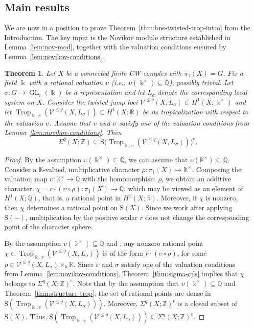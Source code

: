 \documentclass[11pt]{amsart}
\newtheorem{theorem}{Theorem}[section]
\theoremstyle{definition}
\newcommand{\Z}{\mathbb{Z}}
\newcommand{\Q}{\mathbb{Q}}
\newcommand{\R}{\mathbb{R}}
\newcommand{\K}{\mathbb{K}}
\renewcommand{\k}{\Bbbk}
\newcommand{\VV}{\mathcal{V}}
\newcommand{\rS}{\mathrm{S}}
\DeclareMathOperator{\GL}{GL}
\DeclareMathOperator{\Trop}{Trop}
\newcommand{\compl}{\mathrm{c}}
\begin{document}
\subsection{Main results}
\label{subsec:main}

We are now in a position to prove Theorem~\ref{thm:bns-twisted-trop-intro}
from the Introduction. The key input is the Novikov module structure
established in Lemma~\ref{lem:nov-mod}, together with the valuation
conditions ensured by Lemma~\ref{lem:novikov-conditions}.

\begin{theorem}
\label{thm:bns-twisted-trop}
Let $X$ be a connected finite CW-complex with $\pi_1(X)=G$. 
Fix a field $\k$ with a rational valuation
$\upsilon$ (i.e., $\upsilon(\k^{\times})\subseteq \Q$), possibly trivial. 
Let $\sigma\colon G\to \GL_r(\k)$ be a representation 
and let $L_\sigma$ denote the corresponding local system on $X$. 
Consider the twisted jump loci 
$\VV^{\le q}(X,L_\sigma)\subset H^1(X;\k^{\times})$ 
and let $\Trop_{\k,\upsilon}( \VV^{\le q}(X,L_\sigma))
\subset H^1(X;\R)$ be its tropicalization with respect 
to the valuation $\upsilon$. Assume that $\upsilon$ and $\sigma$ satisfy one of the 
valuation conditions from 
Lemma~\ref{lem:novikov-conditions}.  Then 
\[
\Sigma^q(X;\Z) \subseteq 
\rS\big(\!\Trop_{\k,\upsilon}(\VV^{\le q}(X,L_{\sigma}))\big)^{\compl}.
\]
\end{theorem}

\begin{proof}
By the assumption $\upsilon(\k^\times)\subseteq \Q$, we can assume that 
$\upsilon(\K^\times)\subseteq \Q$. Consider a $\K$-valued, multiplicative 
character $\rho\colon \pi_1(X)\to \K^{\times}$. Composing the valuation map 
$\upsilon\colon \K^{\times}\to \Q$ with the homomorphism 
$\rho$, we obtain an additive character, 
$\chi= r\cdot(\upsilon\circ \rho)\colon \pi_1(X) \to \Q$, 
which may be viewed as an element of $H^1(X;\Q)$, that is, 
a rational point in $H^1(X;\R)$. 
Moreover, if $\chi$ is nonzero, then $\chi$ 
determines a rational point on $\rS(X)$. 
Since we work after applying $\rS(-)$, multiplication by the positive 
scalar $r$ does not change the corresponding point of the character sphere.

By the assumption $\upsilon(\k^{\times})\subseteq \Q$ and 
\cite[Thm.~7.11]{Ra12}, any nonzero rational point  
$\chi \in \Trop_{\k,\upsilon}(\VV^{\le q}(X,L_\sigma))$ 
is of the form $r\cdot(\upsilon\circ \rho)$, 
for some $\rho\in \VV^{\le q}(X, L_\sigma)\times_{\k}\K$.
Since  $\upsilon$ and $\sigma$ satisfy one of the 
valuation conditions from 
Lemma~\ref{lem:novikov-conditions}, 
Theorem~\ref{thm:sigma-cjls} implies that $\chi$ 
belongs to $\Sigma^q(X;\Z)^{\compl}$.  
Note that by the assumption that $\upsilon(\k^{\times})\subseteq \Q$ 
and Theorem~\ref{thm:structure-trop}, 
the set of rational points are dense in 
$\rS(\Trop_{\k,\upsilon}(  \VV^{\le q}(X,L_\sigma)))$. Moreover, 
$\Sigma^q(X;\Z)^{\compl}$ is a closed subset of $\rS(X)$.  Thus, 
$\rS(\Trop_{\k,\upsilon}( \VV^{\le q}(X,L_\sigma)))
\subseteq \Sigma^q(X;\Z)^{\compl}$. 
\end{proof}
\end{document}
